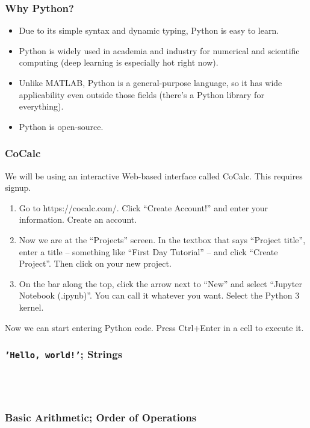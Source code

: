 \documentclass{beamer}
\begin{document}
\begin{frame}
  \frametitle{Why Python?}
  \begin{itemize}
    \pause
  \item Due to its simple syntax and dynamic typing, Python is easy to learn.
    \pause
  \item Python is widely used in academia and industry for numerical and scientific computing (deep learning is especially hot right now).
    \pause
  \item Unlike MATLAB, Python is a general-purpose language, so it has wide applicability even outside those fields (there's a Python library for everything).
    \pause
  \item Python is open-source.
  \end{itemize}
\end{frame}

\begin{frame}
  \frametitle{CoCalc}
  We will be using an interactive Web-based interface called CoCalc. This requires signup.
  \begin{enumerate}
  \item Go to https://cocalc.com/. Click ``Create Account!'' and enter your information. Create an account.
  \item Now we are at the ``Projects'' screen. In the textbox that says ``Project title'', enter a title -- something like ``First Day Tutorial'' -- and click ``Create Project''. Then click on your new project.
  \item On the bar along the top, click the arrow next to ``New'' and select ``Jupyter Notebook (.ipynb)''. You can call it whatever you want. Select the Python 3 kernel.
  \end{enumerate}
  Now we can start entering Python code. Press Ctrl+Enter in a cell to execute it.
\end{frame}

\begin{frame}[fragile]
  \frametitle{\texttt{'Hello, world!'}; Strings}
  \inputminted[firstline=1,lastline=2]{pycon}{code/hello_world.txt}
  \codepause
  \inputminted[firstline=3,lastline=4]{pycon}{code/hello_world.txt}
  \codepause
  \inputminted[firstline=5,lastline=6]{pycon}{code/hello_world.txt}
  \codepause
  \inputminted[firstline=7,lastline=8]{pycon}{code/hello_world.txt}
\end{frame}

\begin{frame}[fragile]
  \frametitle{Basic Arithmetic; Order of Operations}
  \inputminted[firstline=1,lastline=4]{pycon}{code/order_of_operations.txt}
  \codepause
  \inputminted[firstline=5,lastline=8]{pycon}{code/order_of_operations.txt}
  \codepause
\inputminted[firstline=9,lastline=12]{pycon}{code/order_of_operations.txt}
\end{frame}
\end{document}
